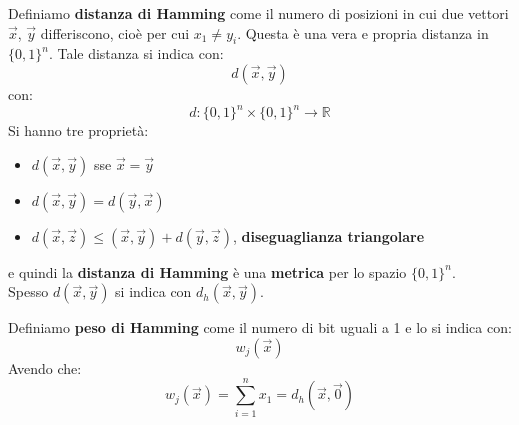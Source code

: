 \documentclass[a4paper,12pt, oneside]{book}
\begin{document}
\begin{definizione}
  Definiamo \textbf{distanza di Hamming} come il numero di posizioni in cui due
  vettori $\vec{x}$, $\vec{y}$ differiscono, cioè per cui $x_1\neq y_i$. Questa
  è una vera e propria distanza in $\{0,1\}^n$. Tale distanza si indica con:
  \[d(\vec{x},\vec{y})\]
  con:
  \[d:\{0,1\}^n\times\{0,1\}^n\to\mathbb{R}\]
  Si hanno tre proprietà:
  \begin{itemize}
    \item $d(\vec{x},\vec{y})$ sse $\vec{x}=\vec{y}$
    \item $d(\vec{x},\vec{y})=d(\vec{y},\vec{x})$
    \item $d(\vec{x},\vec{z})\leq(\vec{x},\vec{y})+d(\vec{y},\vec{z})$,
    \textbf{diseguaglianza triangolare}
  \end{itemize}
  e quindi la \textbf{distanza di Hamming} è una \textbf{metrica} per lo spazio
  $\{0,1\}^n$.\\
  Spesso $d(\vec{x},\vec{y})$ si indica con $d_h(\vec{x},\vec{y})$.
\end{definizione}
\begin{definizione}
  Definiamo \textbf{peso di Hamming} come il numero di bit uguali a 1 e lo si
  indica con:
  \[w_j(\vec{x})\]
  Avendo che:
  \[w_j(\vec{x})=\sum_{i=1}^n x_1=d_h(\vec{x},\vec{0})\]
\end{definizione}
\end{document}
